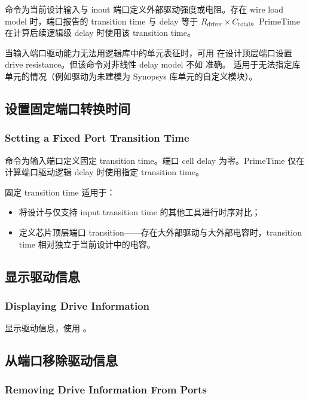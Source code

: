 命令为当前设计输入与 inout 端口定义外部驱动强度或电阻。存在 wire load model 时，端口报告的 transition time 与 delay 等于 $R_{\mathrm{driver}} \times C_{\mathrm{total}}$。PrimeTime 在计算后续逻辑级 delay 时使用该 transition time。

当输入端口驱动能力无法用逻辑库中的单元表征时，可用  在设计顶层端口设置 drive resistance。但该命令对非线性 delay model 不如  准确。 适用于无法指定库单元的情况（例如驱动为未建模为 Synopsys 库单元的自定义模块）。

\subsection{设置固定端口转换时间}
\subsubsection*{Setting a Fixed Port Transition Time}

 命令为输入端口定义固定 transition time。端口 cell delay 为零。PrimeTime 仅在计算端口驱动逻辑 delay 时使用指定 transition time。

固定 transition time 适用于：
\begin{itemize}
  \item 将设计与仅支持 input transition time 的其他工具进行时序对比；
  \item 定义芯片顶层端口 transition——存在大外部驱动与大外部电容时，transition time 相对独立于当前设计中的电容。
\end{itemize}

\subsection{显示驱动信息}
\subsubsection*{Displaying Drive Information}

显示驱动信息，使用 。

\subsection{从端口移除驱动信息}
\subsubsection*{Removing Drive Information From Ports}

